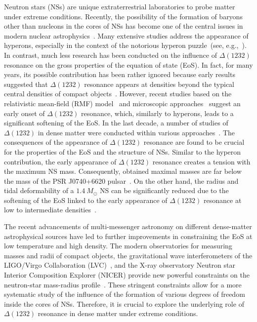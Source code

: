 \documentclass[preprint,showkeys,lengthcheck,nofootinbib,twocolumn,notitlepage,floatfix,superscriptaddress]{revtex4-1}
\begin{document}
Neutron stars (NSs) are unique extraterrestrial laboratories to probe matter under extreme conditions. Recently, the possibility of the formation of baryons other than nucleons in the cores of NSs has become one of the central issues in modern nuclear astrophysics~\cite{Oertel:2016bki}. Many extensive studies address the appearance of hyperons, especially in the context of the notorious hyperon puzzle~(see, e.g.,~\cite{Glendenning:1984jr, Drago:2013fsa, Baym:2017whm, Lattimer:2006qiu, Raduta:2017wpp, Fortin:2017cvt, Oertel:2014qza, Gomes:2014aka, Katayama:2015dga, Bombaci:2016xzl}). In contrast, much less research has been conducted on the influence of $\Delta(1232)$ resonance on the gross properties of the equation of state (EoS). In fact, for many years, its possible contribution has been rather ignored because early results suggested that $\Delta(1232)$ resonance appears at densities beyond the typical central densities of compact objects~\cite{Glendenning:1984jr}. However, recent studies based on the relativistic mean-field (RMF) model~\cite{Drago:2014oja} and microscopic approaches~\cite{Li:2019tjx} suggest an early onset of $\Delta(1232)$ resonance, which, similarly to hyperons, leads to a significant softening of the EoS. In the last decade, a number of studies of $\Delta(1232)$ in dense matter were conducted within various approaches~\cite{Drago:2014oja, Li:2018qaw, Motta:2019ywl, Li:2020ias, Li:2019tjx, Cai:2015hya, Zhu:2016mtc, Sahoo:2018xeu, Sen:2021bms, Malfatti:2020onm, Ribes:2019kno, Schurhoff:2010ph, Drago:2013fsa, Marczenko:2021uaj}. The consequences of the appearance of $\Delta(1232)$ resonance are found to be crucial for the properties of the EoS and the structure of NSs. Similar to the hyperon contribution, the early appearance of $\Delta(1232)$ resonance creates a tension with the maximum NS mass. Consequently, obtained maximal masses are far below the mass of the PSR J0740+6620 pulsar~\cite{Demorest:2010bx, Antoniadis:2013pzd, Fonseca:2016tux, Cromartie:2019kug, Fonseca:2021wxt}. On the other hand, the radius and tidal deformability of a $1.4~M_\odot$ NS can be significantly reduced due to the softening of the EoS linked to the early appearance of $\Delta(1232)$ resonance at low to intermediate densities~\cite{Li:2018qaw, Li:2019tjx}. 

The recent advancements of multi-messenger astronomy on different dense-matter astrophysical sources have led to further improvements in constraining the EoS at low temperature and high density. The modern observatories for measuring masses and radii of compact objects, the gravitational wave interferometers of the LIGO/Virgo Collaboration (LVC)~\cite{Abbott:2018exr, LIGOScientific:2018hze}, and the X-ray observatory Neutron star Interior Composition Explorer (NICER) provide new powerful constraints on the neutron-star mass-radius profile~\cite{Riley:2019yda, Miller:2019cac, Miller:2021qha, Riley:2021pdl}. These stringent constraints allow for a more systematic study of the influence of the formation of various degrees of freedom inside the cores of NSs. Therefore, it is crucial to explore the underlying role of $\Delta(1232)$ resonance in dense matter under extreme conditions.
\end{document}
